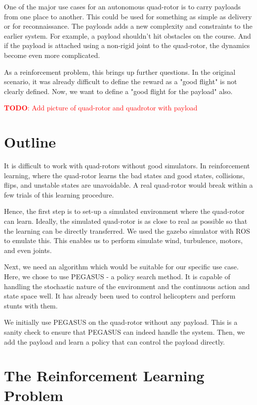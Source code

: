 \documentclass[BTech]{iitmdiss}
\newcommand\todo[1]{\textcolor{red}{{\bf TODO}: #1}}
\begin{document}
One of the major use cases for an autonomous quad-rotor is to carry payloads from one place to another. This could be used for something as simple as delivery or for reconnaissance. The payloads adds a new complexity and constraints to the earlier system. For example, a payload shouldn't hit obstacles on the course. And if the payload is attached using a non-rigid joint to the quad-rotor, the dynamics become even more complicated.

As a reinforcement problem, this brings up further questions. In the original scenario, it was already difficult to define the reward as a "good flight" is not clearly defined. Now, we want to define a "good flight for the payload" also.

\todo{Add picture of quad-rotor and quadrotor with payload}

\section{Outline}

It is difficult to work with quad-rotors without good simulators. In reinforcement learning, where the quad-rotor learns the bad states and good states, collisions, flips, and unstable states are unavoidable. A real quad-rotor would break within a few trials of this learning procedure.

Hence, the first step is to set-up a simulated environment where the quad-rotor can learn. Ideally, the simulated quad-rotor is as close to real as possible so that the learning can be directly transferred. We used the gazebo simulator with ROS to emulate this. This enables us to perform simulate wind, turbulence, motors, and even joints.

Next, we need an algorithm which would be suitable for our specific use case. Here, we chose to use PEGASUS - a policy search method. It is capable of handling the stochastic nature of the environment and the continuous action and state space well. It has already been used to control helicopters and perform stunts with them.

We initially use PEGASUS on the quad-rotor without any payload. This is a sanity check to ensure that PEGASUS can indeed handle the system. Then, we add the payload and learn a policy that can control the payload directly.

\section{The Reinforcement Learning Problem}
\end{document}
